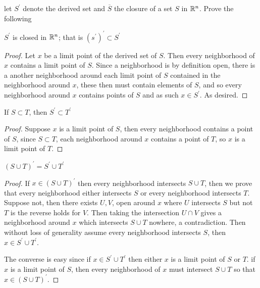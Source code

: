     \question
    let $S^\prime$ denote the derived set and $\overline{S}$ the closure of a set $S$ in $\mathbb{R}^n$. Prove the 
    following 

    \begin{alphaparts}
        \questionpart 
        $S^\prime$ is closed in $\mathbb{R}^n$; that is $(s^\prime)^\prime \subset S^\prime$ 

        \begin{proof}
            Let $x$ be a limit point of the derived set of $S$. Then every neighborhood of $x$ contains a limit 
            point of $S$. Since a neighborhood is by definition open, there is a another neighborhood around each limit point 
            of $S$ contained in the neighborhood around $x$, these then must contain elements of $S$, and so every neighborhood around $x$ 
            contains points of $S$ and as such $x \in S^\prime$. As desired. 
        \end{proof}

        \questionpart 
        If $S \subset T$, then $S^\prime \subset T^\prime$ 

        \begin{proof}
            Suppose $x$ is a limit point of $S$, then every neighborhood contains a point of $S$, 
            since $S \subset T$, each neighborhood around $x$ contains a point of $T$, so $x$ is a limit point of $T$. 

        \end{proof}

        \questionpart 
        $(S \cup T)^\prime = S^\prime \cup T^\prime$

        \begin{proof}
            If $x \in (S \cup T)^\prime$ then every neighborhood intersects $S \cup T$, 
            then we prove that every neighborhood either intersects $S$ or every neighborhood intersects $T$. Suppose 
            not, then there exists $U, V$, open around $x$ where $U$ intersects $S$ but not $T$ is the reverse holds for $V$. 
            Then taking the intersection $U \cap V$ gives a neighborhood around $x$ which intersects $S \cup T$ nowhere, a contradiction. 
            Then without loss of generality assume every neighborhood intersects $S$, then $x \in S^\prime \cup T^\prime$. 

            The converse is easy since if $x \in S^\prime \cup T^\prime$ then either $x$ is a limit point of $S$ or $T$. 
            if $x$ is a limit point of $S$, then every neighborhood of $x$ must intersect $S \cup T$ so that $x \in (S \cup T)^\prime$. 


\end{proof}
\end{alphaparts}
